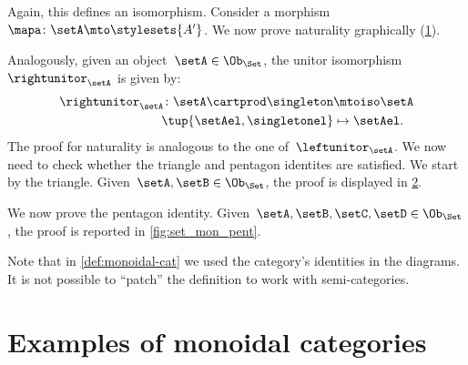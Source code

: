 \begin{example}
    Again, this defines an isomorphism.
    Consider a morphism~$\mapa\colon \setA\mto \stylesets{A'}$.
    We now prove naturality graphically (\cref{fig:monoidal_set_unit_nat}).

    \begin{figure}[h!]
        \centering
        \caption{}
        \label{fig:monoidal_set_unit_nat}
    \end{figure}

    Analogously, given an object~$\setA\in \Ob_{\Set}$, the unitor isomorphism~$\rightunitor_\setA$ is given by:
    \begin{equation*}
        \label{eq:set_mon_prod_5}
        \begin{aligned}
            \rightunitor_\setA\colon \setA\cartprod \singleton & \mtoiso \setA    \\
            \tup{\setAel,\singletonel}                         & \mapsto \setAel.
        \end{aligned}
    \end{equation*}
    The proof for naturality is analogous to the one of~$\leftunitor_\setA$.
    We now need to check whether the triangle and pentagon identites are satisfied.
    We start by the triangle.
    Given~$\setA,\setB\in \Ob_{\Set}$, the proof is displayed in \cref{fig:set_mon_triangle}.

    \begin{figure}[h]
        \centering
        \caption{}
        \label{fig:set_mon_triangle}
    \end{figure}

    We now prove the pentagon identity.
    Given~$\setA,\setB,\setC,\setD\in \Ob_\Set$, the proof is reported in \cref{fig:set_mon_pent}.

    \begin{figure*}[h]
        \centering
        \caption{}
        \label{fig:set_mon_pent}
    \end{figure*}
\end{example}

\begin{remark}
    Note that in \cref{def:monoidal-cat} we used the category's identities in the diagrams.
    It is not possible to ``patch'' the definition to work with semi-categories.
\end{remark}

\section{Examples of monoidal categories}

